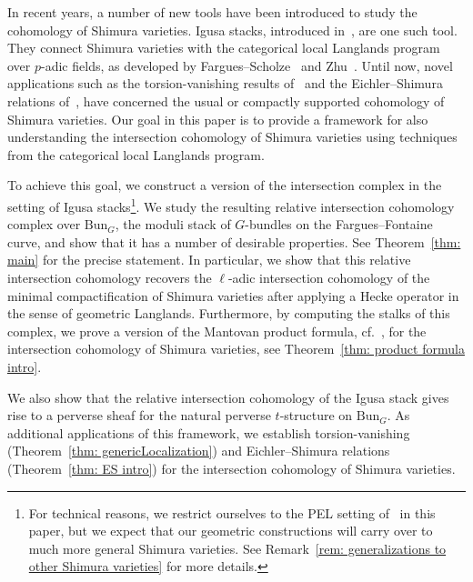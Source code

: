 \documentclass[letterpaper,11pt]{amsart}
\begin{document}
In recent years, a number of new tools have been introduced to study the cohomology of Shimura varieties. 
Igusa stacks, introduced in~\cite{zhang2023, DvHKZ,Kim, DvHKZ2}, are one such tool. They connect Shimura varieties with the categorical local Langlands program over $p$-adic fields, as developed by Fargues--Scholze~\cite{FSGeomLLC} and Zhu~\cite{Zhu}. Until now, novel applications such as the torsion-vanishing results of~\cite{KoTorsionPaper, HamannLeeTorsion, YangZhuTorsion} and the Eichler--Shimura relations of~\cite{KoshikawaES,DvHKZ, DvHKZ2}, have concerned the usual or compactly supported cohomology of Shimura varieties. Our goal in this paper is to provide a framework for also understanding the intersection cohomology of Shimura varieties using techniques from the categorical local Langlands program. 

To achieve this goal, we construct a version of the intersection complex in the setting of Igusa stacks\footnote{For technical reasons, we restrict ourselves to the PEL setting of~\cite{zhang2023} in this paper, but we expect that our geometric constructions will carry over to much more general Shimura varieties. See Remark~\ref{rem: generalizations to other Shimura varieties} for more details.}. We study the resulting relative intersection cohomology complex over $\mathrm{Bun}_G$, the moduli stack of $G$-bundles on the Fargues--Fontaine curve, and show that it has a number of desirable properties. See Theorem~\ref{thm: main} for the precise statement. In particular, we show that this relative intersection cohomology recovers the $\ell$-adic intersection cohomology of the minimal compactification of Shimura varieties after applying a Hecke operator in the sense of geometric Langlands. Furthermore, by computing the stalks of this complex, we prove a version of the Mantovan product formula, cf.~\cite{mantovan-thesis, mantovan-PEL}, for the intersection cohomology of Shimura varieties, see Theorem~\ref{thm: product formula intro}. 

We also show that the relative intersection cohomology of the Igusa stack gives rise to a perverse sheaf for the natural perverse $t$-structure on $\mathrm{Bun}_G$.  As additional applications of this framework, we establish torsion-vanishing (Theorem~\ref{thm: genericLocalization}) and Eichler--Shimura relations (Theorem~\ref{thm: ES intro}) for the intersection cohomology of Shimura varieties.  
\end{document}
